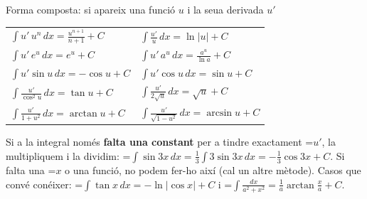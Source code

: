 \documentclass[11pt,a4paper]{article}
\newcommand{\fmm}[1]{\setbox0=\hbox{$#1$}\ifdim\wd0>\linewidth\fmdisp{#1}\else\mbox{\box0}\fi}
\newcommand{\fmdisp}[1]{\[\setbox2=\hbox{$\displaystyle #1$}\ifdim\wd2>\linewidth\resizebox{\linewidth}{!}{\box2}\else\box2\fi\]}
\begin{document}
\begin{fmdef}{Forma composta: si apareix una funció $u$ i la seua derivada $u'$}
\begin{center}\renewcommand{\arraystretch}{1.5}\small\begin{tabularx}{\linewidth}{>{\raggedright\arraybackslash}p{7.2cm}>{\raggedright\arraybackslash}X}\toprule
$\displaystyle\int u'\,u^n\,dx=\frac{u^{n+1}}{n+1}+C$ & $\displaystyle\int\frac{u'}{u}\,dx=\ln|u|+C$\\[3pt]
$\displaystyle\int u'\,e^u\,dx=e^u+C$ & $\displaystyle\int u'\,a^u\,dx=\frac{a^u}{\ln a}+C$\\[3pt]
$\displaystyle\int u'\sin u\,dx=-\cos u+C$ & $\displaystyle\int u'\cos u\,dx=\sin u+C$\\[3pt]
$\displaystyle\int\frac{u'}{\cos^2u}\,dx=\tan u+C$ & $\displaystyle\int\frac{u'}{2\sqrt u}\,dx=\sqrt u+C$\\[3pt]
$\displaystyle\int\frac{u'}{1+u^2}\,dx=\arctan u+C$ & $\displaystyle\int\frac{u'}{\sqrt{1-u^2}}\,dx=\arcsin u+C$\\[3pt]
\bottomrule\end{tabularx}\end{center}

Si a la integral només \textbf{falta una constant} per a tindre exactament \fmm{u'}, la multipliquem i la dividim: \fmm{\int\sin3x\,dx=\frac13\int3\sin3x\,dx=-\frac13\cos3x+C}. Si falta una \fmm{x} o una funció, no podem fer-ho així (cal un altre mètode). Casos que convé conéixer: \fmm{\int\tan x\,dx=-\ln|\cos x|+C} i \fmm{\int\frac{dx}{a^2+x^2}=\frac1a\arctan\frac xa+C}.
\end{fmdef}
\end{document}
